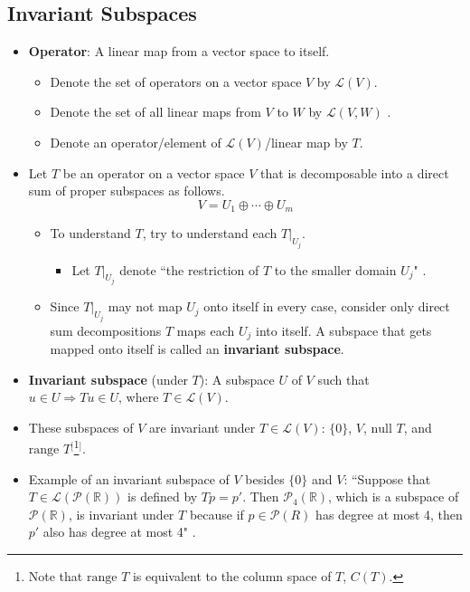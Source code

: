 \documentclass[titlepage]{article}
\numberwithin{figure}{section}
\numberwithin{equation}{section}
\numberwithin{theorem}{section}
\newcommand{\R}{\mathbb{R}}
\newcommand{\dq}[4][]{``#2"#1 \cite[#4]{#3}.}
\newcommand{\Li}{\mathcal{L}}
\begin{document}
\subsection{Invariant Subspaces}
\begin{itemize}
    \item \textbf{Operator}: A linear map from a vector space to itself.
    \begin{itemize}
        \item Denote the set of operators on a vector space $V$ by $\Li(V)$.
        \item Denote the set of all linear maps from $V$ to $W$ by $\Li(V,W)$ \cite[52]{bib:Axler}.
        \item Denote an operator/element of $\Li(V)$/linear map by $T$.
    \end{itemize}
    \item Let $T$ be an operator on a vector space $V$ that is decomposable into a direct sum of proper subspaces as follows.
    \begin{equation*}
        V = U_1 \oplus\cdots\oplus U_m
    \end{equation*}
    \begin{itemize}
        \item To understand $T$, try to understand each $T|_{U_j}$.
        \begin{itemize}
            \item Let $T|_{U_j}$ denote \dq{the restriction of $T$ to the smaller domain $U_j$}{bib:Axler}{132}
        \end{itemize}
        \item Since $T|_{U_j}$ may not map $U_j$ onto itself in every case, consider only direct sum decompositions $T$ maps each $U_j$ into itself. A subspace that gets mapped onto itself is called an \textbf{invariant subspace}.
    \end{itemize}
    \item \textbf{Invariant subspace} (under $T$): A subspace $U$ of $V$ such that $u\in U \Rightarrow Tu\in U$, where $T\in\Li(V)$.
    \item These subspaces of $V$ are invariant under $T\in\Li(V)$: $\{0\}$, $V$, $\text{null }T$, and $\text{range }T$$^[$\footnote{Note that $\text{range }T$ is equivalent to the column space of $T$, $C(T)$.}$^]$.
    \item Example of an invariant subspace of $V$ besides $\{0\}$ and $V$: \dq{Suppose that $T\in\Li(\mathcal{P}(\R))$ is defined by $Tp=p'$. Then $\mathcal{P}_4(\R)$, which is a subspace of $\mathcal{P}(\R)$, is invariant under $T$ because if $p\in\mathcal{P}(R)$ has degree at most 4, then $p'$ also has degree at most 4}{bib:Axler}{133}
$$
\end{itemize}
\end{document}
